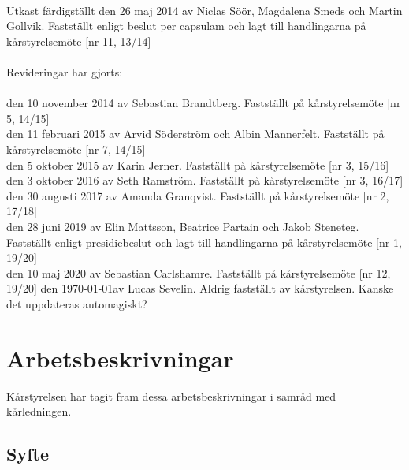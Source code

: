 
\newcommand{\sectionbreak}{\clearpage}


%
%
\vspace*{9 cm}
\noindent
{\huge{}}\\

\vspace{0.2cm}
\noindent
Utkast färdigställt den 26 maj 2014 av Niclas Söör, Magdalena Smeds och
Martin Gollvik. Fastställt enligt beslut per capsulam och lagt till
handlingarna på kårstyrelsemöte {[}nr 11, 13/14{]} \\ \\
Revideringar har gjorts:\\ \\
  den 10 november 2014 av Sebastian Brandtberg. Fastställt på
  kårstyrelsemöte {[}nr 5, 14/15{]} \\
  den 11 februari 2015 av Arvid Söderström och Albin Mannerfelt.
  Fastställt på kårstyrelsemöte {[}nr 7, 14/15{]} \\
  den 5 oktober 2015 av Karin Jerner. Fastställt på kårstyrelsemöte
  {[}nr 3, 15/16{]} \\
  den 3 oktober 2016 av Seth Ramström. Fastställt på kårstyrelsemöte
  {[}nr 3, 16/17{]} \\
  den 30 augusti 2017 av Amanda Granqvist. Fastställt på kårstyrelsemöte
  {[}nr 2, 17/18{]} \\
  den 28 juni 2019 av Elin Mattsson, Beatrice Partain och Jakob
  Steneteg. Fastställt enligt presidiebeslut och lagt till handlingarna
  på kårstyrelsemöte {[}nr 1, 19/20{]} \\
  den 10 maj 2020 av Sebastian Carlshamre. Fastställt på kårstyrelsemöte
  {[}nr 12, 19/20{]}
  den \today av Lucas Sevelin. Aldrig fastställt av kårstyrelsen. Kanske det uppdateras automagiskt?

%
%
\vspace*{1 mm}
\tableofcontents

\hypertarget{arbetsbeskrivningar}{%
\section{Arbetsbeskrivningar}\label{arbetsbeskrivningar}}

Kårstyrelsen har tagit fram dessa arbetsbeskrivningar i samråd med
kårledningen.

\hypertarget{syfte}{%
\subsection{Syfte}\label{syfte}}

